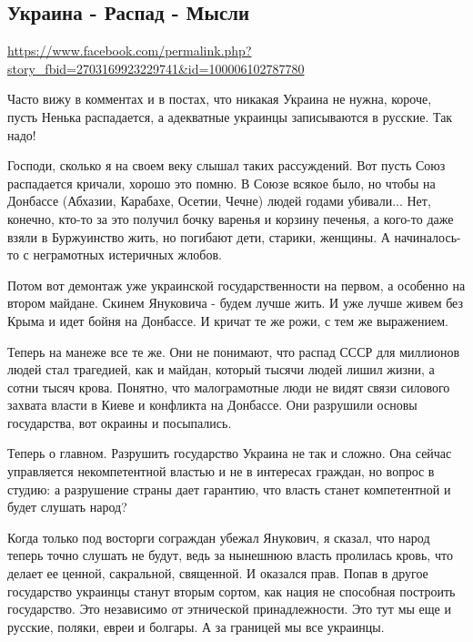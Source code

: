  
 
 
 
 

\subsection{Украина - Распад - Мысли}
\url{https://www.facebook.com/permalink.php?story_fbid=2703169923229741&id=100006102787780}

Часто вижу в комментах и в постах, что никакая Украина не нужна, короче, пусть
Ненька распадается, а адекватные украинцы записываются в русские. Так надо! 

Господи, сколько я на своем веку слышал таких рассуждений. Вот пусть Союз
распадается кричали, хорошо это помню. В Союзе всякое было, но чтобы на
Донбассе (Абхазии, Карабахе, Осетии, Чечне) людей годами убивали... Нет,
конечно, кто-то за это получил бочку варенья и корзину печенья, а кого-то даже
взяли в Буржуинство жить, но погибают дети, старики, женщины. А начиналось-то с
неграмотных истеричных жлобов. 

Потом вот демонтаж уже украинской государственности на первом, а особенно на
втором майдане. Скинем Януковича - будем лучше жить. И уже лучше живем без
Крыма и идет бойня на Донбассе. И кричат те же рожи, с тем же выражением. 

Теперь на манеже все те же. Они не понимают, что распад СССР для миллионов
людей стал трагедией, как и майдан, который тысячи людей лишил жизни, а сотни
тысяч крова. Понятно, что малограмотные люди не видят связи силового захвата
власти в Киеве и конфликта на Донбассе. Они разрушили основы государства, вот
окраины и посыпались. 

Теперь о главном. Разрушить государство Украина не так и сложно. Она сейчас
управляется некомпетентной властью и не в интересах граждан, но вопрос в
студию: а разрушение страны дает гарантию, что власть станет компетентной и
будет слушать народ?

Когда только под восторги сограждан убежал Янукович, я сказал, что народ теперь
точно слушать не будут, ведь за нынешнюю власть пролилась кровь, что делает ее
ценной, сакральной, священной. И оказался прав. Попав в другое государство
украинцы станут вторым сортом, как нация не способная построить государство.
Это независимо от этнической принадлежности. Это тут мы еще и русские, поляки,
евреи и болгары. А за границей мы все украинцы. 

